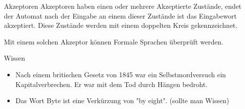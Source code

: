 \documentclass{beamer}
\begin{document}
\begin{frame}
	\begin{block}{Akzeptoren}
		Akzeptoren haben einen oder mehrere Akzeptierte Zustände, endet der Automat nach der Eingabe an einem dieser Zustände ist das Eingabewort akzeptiert.
		Diese Zustände werden mit einem doppelten Kreis gekennzeichnet.
		
		Mit einem solchen Akzeptor können Formale Sprachen überprüft werden.
	\end{block}
\end{frame}

\begin{frame}
	\begin{block}{Wissen}
		\begin{itemize}
			\item Nach einem britischen Gesetz von 1845 war ein Selbstmordversuch ein Kapitalverbrechen. Er war mit dem Tod durch Hängen bedroht.
			\item Das Wort Byte ist eine Verkürzung von "by eight". (sollte man Wissen)
		\end{itemize}
	\end{block}
\end{frame}
\end{document}
